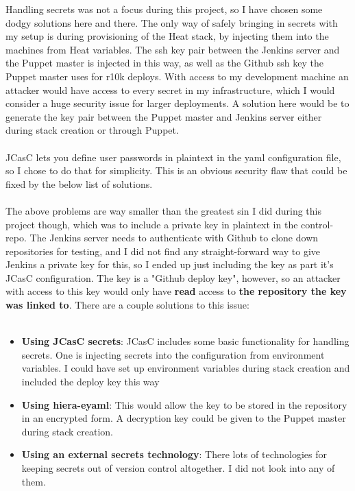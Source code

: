 Handling secrets was not a focus during this project, so I have chosen some dodgy solutions here and there. The only way of safely bringing in secrets with my setup is during provisioning of the Heat stack, by injecting them into the machines from Heat variables. The ssh key pair between the Jenkins server and the Puppet master is injected in this way, as well as the Github ssh key the Puppet master uses for r10k deploys. With access to my development machine an attacker would have access to every secret in my infrastructure, which I would consider a huge security issue for larger deployments. A solution here would be to generate the key pair between the Puppet master and Jenkins server either during stack creation or through Puppet.
\\
\\
JCasC lets you define user passwords in plaintext in the yaml configuration file, so I chose to do that for simplicity. This is an obvious security flaw that could be fixed by the below list of solutions.
\\
\\
The above problems are way smaller than the greatest sin I did during this project though, which was to include a private key in plaintext in the control-repo. The Jenkins server needs to authenticate with Github to clone down repositories for testing, and I did not find any straight-forward way to give Jenkins a private key for this, so I ended up just including the key as part it's JCasC configuration. The key is a "Github deploy key"\cite{githubdeploykeyarticle}, however, so an attacker with access to this key would only have \textbf{read} access to \textbf{the repository the key was linked to}. There are a couple solutions to this issue:
\\
\\
\begin{itemize}  
\item \textbf{Using JCasC secrets}: JCasC includes some basic functionality for handling secrets\cite{jcascgithub}. One is injecting secrets into the configuration from environment variables. I could have set up environment variables during stack creation and included the deploy key this way
\item \textbf{Using hiera-eyaml}: This would allow the key to be stored in the repository in an encrypted form. A decryption key could be given to the Puppet master during stack creation.
\item \textbf{Using an external secrets technology}: There lots of technologies for keeping secrets out of version control altogether. I did not look into any of them.
\end{itemize}

